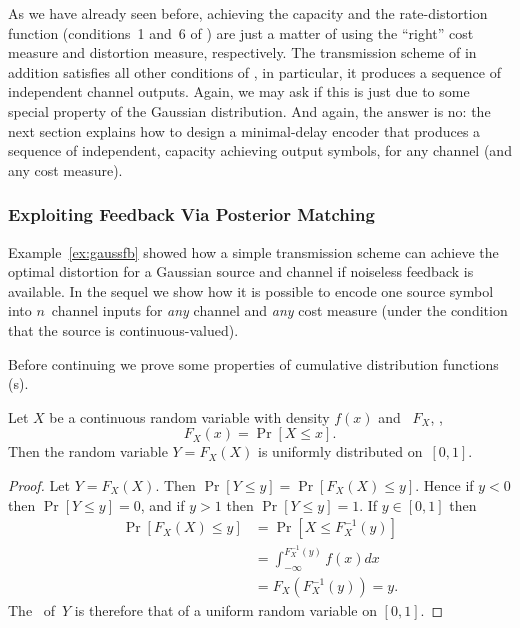 As we have already seen before, achieving the capacity and the rate-distortion
function (conditions~1 and~6 of ) are just a matter
of using the ``right'' cost measure and distortion measure, respectively. The
transmission scheme of  in addition satisfies all other
conditions of , in particular, it produces a
sequence of independent channel outputs. Again, we may ask if this is just due
to some special property of the Gaussian distribution. And again, the answer is
no: the next section explains how to design a minimal-delay encoder that
produces a sequence of independent, capacity achieving output symbols, for any
channel (and any cost measure).


\subsubsection{Exploiting Feedback Via Posterior Matching}

Example~\ref{ex:gaussfb} showed how a simple transmission scheme can achieve the
optimal distortion for a Gaussian source and channel if noiseless feedback is
available. In the sequel
we show how it is possible to encode one source symbol into $n$~channel inputs
for \emph{any} channel and \emph{any} cost measure (under the condition that the
source is continuous-valued).

Before continuing we prove some properties of cumulative distribution functions
(\cdf s).

\begin{lemma}
  \label{lem:cdfunif}
  Let $X$ be a continuous random variable with density $f(x)$ and \cdf\ $F_X$,
  \ie,
  \begin{equation*}
    F_X(x) = \Pr[X \le x].
  \end{equation*}
  Then the random variable $Y = F_X(X)$ is uniformly distributed on~$[0,1]$.
\end{lemma}

\begin{proof}
  Let $Y = F_X(X)$. Then $\Pr[Y \le y] = \Pr[F_X(X) \le y]$.
  Hence if $y < 0$ then $\Pr[Y \le y] = 0$, and if $y > 1$ then $\Pr[Y \le y] =
  1$.  If $y \in [0,1]$ then
  \begin{align*}
    \Pr[F_X(X) \le y] &= \Pr[X \le F_X^{-1}(y)] \\
    &= \int_{-\infty}^{F_X^{-1}(y)} f(x) dx \\
    &= F_X(F_X^{-1}(y)) = y.
  \end{align*}
  The \cdf\ of~$Y$ is therefore that of a uniform random variable on $[0,1]$.
\end{proof}


